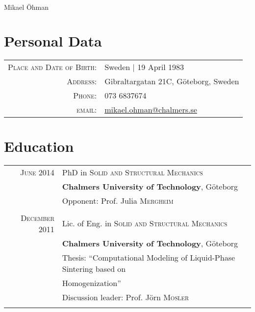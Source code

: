 \documentclass[a4paper,10pt]{article} %
\begin{document}
\pagestyle{empty} %



\par{{\centering
\Huge Mikael Öhman\bigskip
\par} %

\section{Personal Data}

\begin{tabular}{rl}
\textsc{Place and Date of Birth:} & Sweden  | 19 April 1983 \\
\textsc{Address:} & Gibraltargatan 21C, Göteborg, Sweden \\
\textsc{Phone:} & 073 6837674\\
\textsc{email:} & \href{mailto:mikael.ohman@chalmers.se}{mikael.ohman@chalmers.se}
\end{tabular}


\section{Education}

\begin{tabular}{rl}


\textsc{June} 2014 & PhD in \textsc{Solid and Structural Mechanics} \\
& \textbf{Chalmers University of Technology}, Göteborg\\
& \small Opponent: Prof. Julia \textsc{Mergheim}\\
&\\


\textsc{December} 2011 & Lic. of Eng. in \textsc{Solid and Structural Mechanics} \\
& \textbf{Chalmers University of Technology}, Göteborg\\
& Thesis: ``Computational Modeling of Liquid-Phase Sintering based on \\
& Homogenization''\\
& \small Discussion leader: Prof. Jörn \textsc{Mosler}\\
&\\


\end{tabular}}
\end{document}
